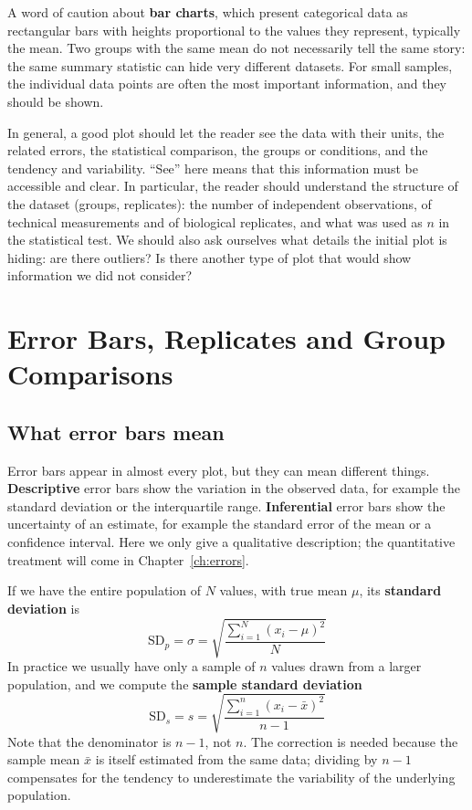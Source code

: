 \documentclass[letterpaper,11pt,leqno]{book}
\begin{document}
A word of caution about \textbf{bar charts}, which present categorical data as rectangular bars with heights proportional to the values they represent, typically the mean. Two groups with the same mean do not necessarily tell the same story: the same summary statistic can hide very different datasets. For small samples, the individual data points are often the most important information, and they should be shown.

In general, a good plot should let the reader see the data with their units, the related errors, the statistical comparison, the groups or conditions, and the tendency and variability. ``See'' here means that this information must be accessible and clear. In particular, the reader should understand the structure of the dataset (groups, replicates): the number of independent observations, of technical measurements and of biological replicates, and what was used as $n$ in the statistical test. We should also ask ourselves what details the initial plot is hiding: are there outliers? Is there another type of plot that would show information we did not consider?

\section{Error Bars, Replicates and Group Comparisons}
\label{sec:error_bars_replicates}

\subsection{What error bars mean}
\label{sec:sd_sem}

Error bars appear in almost every plot, but they can mean different things. \textbf{Descriptive} error bars show the variation in the observed data, for example the standard deviation or the interquartile range. \textbf{Inferential} error bars show the uncertainty of an estimate, for example the standard error of the mean or a confidence interval. Here we only give a qualitative description; the quantitative treatment will come in Chapter~\ref{ch:errors}.

If we have the entire population of $N$ values, with true mean $\mu$, its \textbf{standard deviation} is
\begin{equation}
\boxed{\text{SD}_p = \sigma = \sqrt{\frac{\sum_{i=1}^{N} (x_i - \mu)^2}{N}}}
\label{eq:population_sd}
\end{equation}
In practice we usually have only a sample of $n$ values drawn from a larger population, and we compute the \textbf{sample standard deviation}
\begin{equation}
\boxed{\text{SD}_s = s = \sqrt{\frac{\sum_{i=1}^{n} (x_i - \bar{x})^2}{n - 1}}}
\label{eq:sample_sd}
\end{equation}
Note that the denominator is $n - 1$, not $n$. The correction is needed because the sample mean $\bar{x}$ is itself estimated from the same data; dividing by $n - 1$ compensates for the tendency to underestimate the variability of the underlying population.
\end{document}
